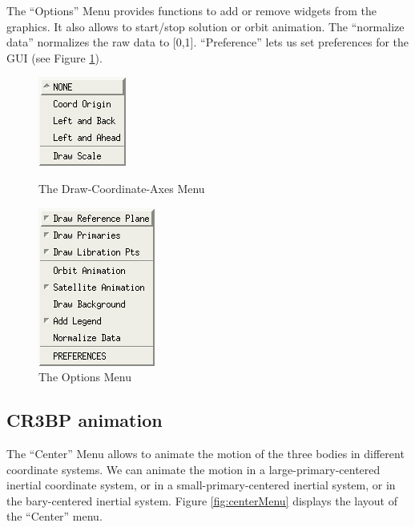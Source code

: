 The ``Options'' Menu provides functions to add or remove widgets from the graphics.
It also allows to start/stop solution or orbit animation.
The ``normalize data'' normalizes the raw data to [0,1]. 
``Preference'' lets  us set preferences for the GUI (see Figure \ref{fig:optionMenu}). 
\begin{figure}[!htmb]
	\centering
    \begin{minipage}[b]{0.5\textwidth}
        \centering
        \includegraphics {./include/drawCoordMenu}
        \caption{The Draw-Coordinate-Axes Menu} \label{fig:coordMenu}
    \end{minipage}%
    \begin{minipage}[b]{0.5\textwidth}
        \centering
        \includegraphics {./include/optionMenu}
    	\caption{The Options Menu} \label{fig:optionMenu}
    \end{minipage}
\end{figure}

\subsection{CR3BP animation}

The ``Center'' Menu allows to animate the motion of the three bodies in different
coordinate systems. We can animate the motion in a large-primary-centered inertial 
coordinate system, or in a small-primary-centered inertial system, or in the bary-centered
inertial system. Figure \ref{fig:centerMenu} displays the layout of the ``Center'' menu. 

